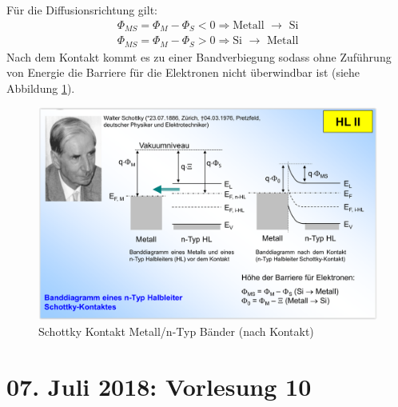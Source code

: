 \documentclass[12pt,a4paper]{report}%
\numberwithin{equation}{section}
\numberwithin{equation}{subsection}
\begin{document}
	Für die Diffusionsrichtung gilt:
	\begin{align}
	  \Phi_{MS} = \Phi_M - \Phi_S < 0 \Rightarrow \text{Metall } \rightarrow \text{ Si} \\
	  \Phi_{MS} = \Phi_M - \Phi_S > 0 \Rightarrow \text{Si } \rightarrow \text{ Metall}
	\end{align}
	Nach dem Kontakt kommt es zu einer Bandverbiegung sodass ohne Zuführung von Energie die Barriere für die Elektronen nicht überwindbar ist (siehe Abbildung \ref{fig:schottky_m-n_banddiagramm_nach}).
	\begin{figure}[H]
	  \centering
	  \captionsetup{justification=centering}
	  \includegraphics[width=0.6\linewidth]{schottky_banddiagramm_n.png}
	  \caption{Schottky Kontakt Metall/n-Typ Bänder (nach Kontakt) \protect\cite{MIKRO2}}
	  \label{fig:schottky_m-n_banddiagramm_nach}
	\end{figure}
	\newpage
	
  \section{07. Juli 2018: Vorlesung 10}
\end{document}
